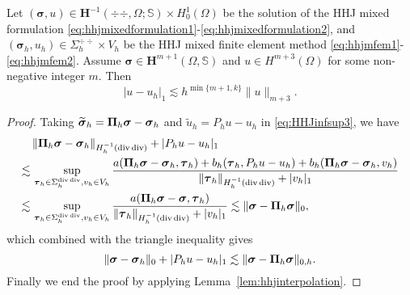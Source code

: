 \begin{theorem}
Let $(\boldsymbol{\sigma} , u)\in \boldsymbol{H}^{-1}(\div\div,\Omega; \mathbb{S})\times H_0^1(\Omega)$ be the solution of the HHJ mixed formulation \eqref{eq:hhjmixedformulation1}-\eqref{eq:hhjmixedformulation2}, and $(\boldsymbol{\sigma}_h, u_h)\in\Sigma_h^{\div\div}\times V_h$ be the HHJ mixed finite element method \eqref{eq:hhjmfem1}-\eqref{eq:hhjmfem2}.
Assume $\boldsymbol{\sigma}\in \boldsymbol{H}^{m+1}(\Omega, \mathbb{S})$ and $u\in H^{m+3}(\Omega)$ for
some non-negative integer $m$.
Then
\[
|u-u_h|_{1}\lesssim h^{\min\{m+1,k\}}\|u\|_{m+3}.%
\]
\end{theorem}
\begin{proof}
Taking $\widetilde{\boldsymbol\sigma}_h=\boldsymbol{\Pi}_h\boldsymbol{\sigma}-\boldsymbol{\sigma}_h$ and $\widetilde{u}_h=P_hu-u_h$ in \eqref{eq:HHJinfsup3},
we have
\begin{align*}
&\,\|\boldsymbol{\Pi}_h\boldsymbol{\sigma}-\boldsymbol{\sigma}_h\|_{H_h^{-1}(\operatorname{div}\operatorname{div})}+|P_hu-u_h|_{1}\\
\lesssim&\, \sup_{\boldsymbol\tau_h\in\Sigma_h^{\operatorname{div}\operatorname{div}}, v_h\in V_h}\frac{a(\boldsymbol{\Pi}_h\boldsymbol\sigma-\boldsymbol\sigma_h, \boldsymbol\tau_h)+ b_h(\boldsymbol\tau_h, P_hu-u_h)+ b_h(\boldsymbol{\Pi}_h\boldsymbol\sigma-\boldsymbol\sigma_h, v_h)}{\|\boldsymbol\tau_h\|_{H_h^{-1}(\operatorname{div}\operatorname{div})}+|v_h|_{1}} \\
\lesssim &\,\sup_{\boldsymbol\tau_h\in\Sigma_h^{\operatorname{div}\operatorname{div}}, v_h\in V_h}\frac{a(\boldsymbol{\Pi}_h\boldsymbol\sigma-\boldsymbol\sigma, \boldsymbol\tau_h)}{\|\boldsymbol\tau_h\|_{H_h^{-1}(\operatorname{div}\operatorname{div})}+|v_h|_{1}}\lesssim \|\boldsymbol\sigma-\boldsymbol{\Pi}_h\boldsymbol\sigma\|_0,
\end{align*}
which combined with the triangle inequality gives
\[
\|\boldsymbol\sigma-\boldsymbol\sigma_h\|_{0}+|P_hu-u_h|_{1}\lesssim \|\boldsymbol\sigma-\boldsymbol{\Pi}_h\boldsymbol\sigma\|_{0,h}.
\]
Finally we end the proof by applying Lemma~\ref{lem:hhjinterpolation}.
\end{proof}


